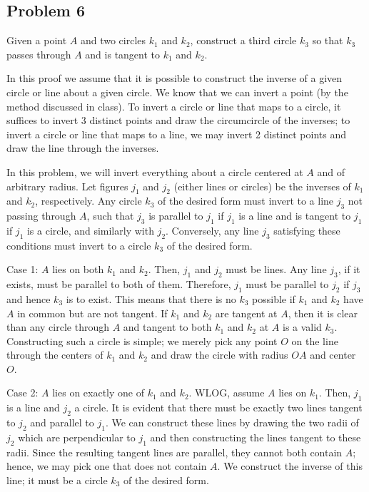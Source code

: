 \subsection{Problem 6}
Given a point $A$ and two circles $k_1$ and $k_2$, construct a third circle $k_3$ so that $k_3$ passes through $A$ and is tangent to $k_1$ and $k_2$.

\begin{mdsoln}
In this proof we assume that it is possible to construct the inverse of a given circle or line about a given circle. We know that we can invert a point (by the method discussed in class). To invert a circle or line that maps to a circle, it suffices to invert 3 distinct points and draw the circumcircle of the inverses; to invert a circle or line that maps to a line, we may invert 2 distinct points and draw the line through the inverses.

In this problem, we will invert everything about a circle centered at $A$ and of arbitrary radius. Let figures $j_1$ and $j_2$ (either lines or circles) be the inverses of $k_1$ and $k_2$, respectively. Any circle $k_3$ of the desired form must invert to a line $j_3$ not passing through $A$, such that $j_3$ is parallel to $j_1$ if $j_1$ is a line and is tangent to $j_1$ if $j_1$ is a circle, and similarly with $j_2$. Conversely, any line $j_3$ satisfying these conditions must invert to a circle $k_3$ of the desired form.

Case 1: $A$ lies on both $k_1$ and $k_2$.
Then, $j_1$ and $j_2$ must be lines. Any line $j_3$, if it exists, must be parallel to both of them. Therefore, $j_1$ must be parallel to $j_2$ if $j_3$ and hence $k_3$ is to exist. This means that there is no $k_3$ possible if $k_1$ and $k_2$ have $A$ in common but are not tangent. If $k_1$ and $k_2$ are tangent at $A$, then it is clear than any circle through $A$ and tangent to both $k_1$ and $k_2$ at $A$ is a valid $k_3$. Constructing such a circle is simple; we merely pick any point $O$ on the line through the centers of $k_1$ and $k_2$ and draw the circle with radius $OA$ and center $O$.

Case 2: $A$ lies on exactly one of $k_1$ and $k_2$.
WLOG, assume $A$ lies on $k_1$. Then, $j_1$ is a line and $j_2$ a circle. It is evident that there must be exactly two lines tangent to $j_2$ and parallel to $j_1$. We can construct these lines by drawing the two radii of $j_2$ which are perpendicular to $j_1$ and then constructing the lines tangent to these radii. Since the resulting tangent lines are parallel, they cannot both contain $A$; hence, we may pick one that does not contain $A$. We construct the inverse of this line; it must be a circle $k_3$ of the desired form.


\end{mdsoln}
